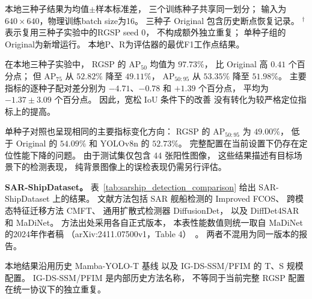 \begin{table}[!t]
\begin{minipage}{\linewidth}
本地三种子结果为均值$\pm$样本标准差，
三个训练种子共享同一划分；
输入为 $640\times640$，物理训练batch size为16。
三种子 Original 包含历史断点恢复记录。
$^{\dagger}$表示复用三种子实验中的RGSP seed 0，
不构成额外独立重复；
单种子组的Original为新增运行。
本地P、R为评估器的最优F1工作点结果。
\end{minipage}
\end{table}

在本地三种子实验中，
RGSP 的 AP$_{50}$ 均值为 $97.73\%$，
比 Original 高 $0.41$ 个百分点；
但 AP$_{75}$ 从 $52.82\%$ 降至 $49.11\%$，
AP$_{50:95}$ 从 $53.35\%$ 降至 $51.98\%$。
主要指标的逐种子配对差分别为
$-4.71$、$-0.78$ 和 $+1.39$ 个百分点，
平均为 $-1.37\pm3.09$ 个百分点。
因此，宽松 IoU 条件下的改善
没有转化为较严格定位指标上的提高。

单种子对照也呈现相同的主要指标变化方向：
RGSP 的 AP$_{50:95}$ 为 $49.00\%$，
低于 Original 的 $54.09\%$
和 YOLOv8n 的 $52.73\%$。
完整配置在当前设置下仍存在定位性能下降的问题。
由于测试集仅包含 44 张阳性图像，
这些结果描述有目标场景下的检测表现，
纯背景图像上的误检表现仍需另行评估。

\textbf{SAR-ShipDataset。}
表~\ref{tab:sarship_detection_comparison}
给出 SAR-ShipDataset 上的结果。
文献方法包括 SAR 舰船检测的 Improved FCOS、
跨模态特征迁移方法 CMFT、
通用扩散式检测器 DiffusionDet，
以及 DiffDet4SAR 和 MaDiNet。
方法出处采用各自正式版本，
本表性能数值则统一取自 MaDiNet 的2024年作者稿
（arXiv:2411.07500v1，Table 4）~\cite{madinet_preprint}。
两者不混用为同一版本的报告。

本地结果沿用历史 Mamba-YOLO-T 基线
以及 IG-DS-SSM/PFIM 的 T、S 规模配置。
IG-DS-SSM/PFIM 是内部历史方法名称，
不等同于当前完整 RGSP 配置在统一协议下的独立重复。

